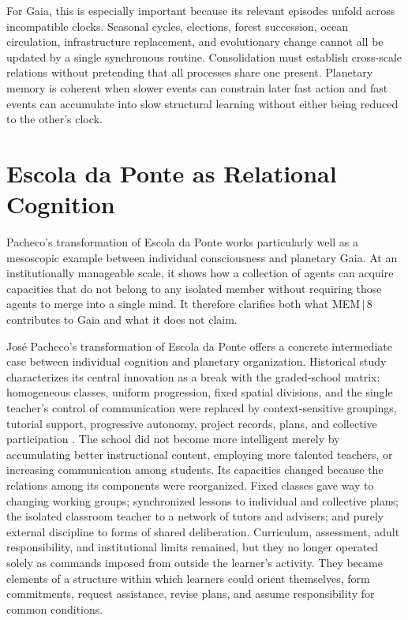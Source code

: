 \documentclass[11pt]{article}
\begin{document}
For Gaia, this is especially important because its relevant episodes unfold across incompatible clocks. Seasonal cycles, elections, forest succession, ocean circulation, infrastructure replacement, and evolutionary change cannot all be updated by a single synchronous routine. Consolidation must establish cross-scale relations without pretending that all processes share one present. Planetary memory is coherent when slower events can constrain later fast action and fast events can accumulate into slow structural learning without either being reduced to the other's clock.

\section{Escola da Ponte as Relational Cognition}

Pacheco's transformation of Escola da Ponte works particularly well as a mesoscopic example between individual consciousness and planetary Gaia. At an institutionally manageable scale, it shows how a collection of agents can acquire capacities that do not belong to any isolated member without requiring those agents to merge into a single mind. It therefore clarifies both what MEM\,$|$\,8 contributes to Gaia and what it does not claim.

José Pacheco's transformation of Escola da Ponte offers a concrete intermediate case between individual cognition and planetary organization. Historical study characterizes its central innovation as a break with the graded-school matrix: homogeneous classes, uniform progression, fixed spatial divisions, and the single teacher's control of communication were replaced by context-sensitive groupings, tutorial support, progressive autonomy, project records, plans, and collective participation \cite{silva2020}. The school did not become more intelligent merely by accumulating better instructional content, employing more talented teachers, or increasing communication among students. Its capacities changed because the relations among its components were reorganized. Fixed classes gave way to changing working groups; synchronized lessons to individual and collective plans; the isolated classroom teacher to a network of tutors and advisers; and purely external discipline to forms of shared deliberation. Curriculum, assessment, adult responsibility, and institutional limits remained, but they no longer operated solely as commands imposed from outside the learner's activity. They became elements of a structure within which learners could orient themselves, form commitments, request assistance, revise plans, and assume responsibility for common conditions.
\end{document}
